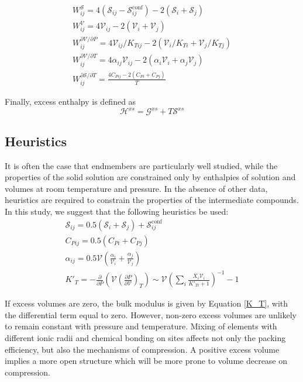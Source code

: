 \documentclass[review]{elsarticle}
\begin{document}
\begin{eqnarray}
  W^{\mathcal{S}}_{ij} = 4 (\mathcal{S}_{ij} - \mathcal{S}^{\textrm{conf}}_{ij}) - 2(\mathcal{S}_i + \mathcal{S}_j) \\
  W^{\mathcal{V}}_{ij} = 4 \mathcal{V}_{ij} - 2(\mathcal{V}_i + \mathcal{V}_j) \\
  W^{\partial\mathcal{V}/\partial P}_{ij} = 4 \mathcal{V}_{ij}/K_{T{ij}} - 2(\mathcal{V}_{i}/K_{T{i}} + \mathcal{V}_{j}/K_{T{j}}) \\
  W^{\partial\mathcal{V}/\partial T}_{ij} = 4 \alpha_{ij} \mathcal{V}_{ij} - 2(\alpha_{i} \mathcal{V}_i + \alpha_{j} \mathcal{V}_j) \\
  W^{\partial\mathcal{S}/\partial T}_{ij} = \frac{4 C_{P{ij}} - 2(C_{P{i}} + C_{P{j}})}{T} 
\end{eqnarray}

Finally, excess enthalpy is defined as
\begin{equation}
 \mathcal{H}^{xs} = \mathcal{G}^{xs} + T\mathcal{S}^{xs}
\end{equation}

\subsection{Heuristics}
It is often the case that endmembers are particularly well studied, while the properties of the solid solution are constrained only by enthalpies of solution and volumes at room temperature and pressure. In the absence of other data, heuristics are required to constrain the properties of the intermediate compounds. In this study, we suggest that the following heuristics be used:
\begin{eqnarray}
  \mathcal{S}_{ij} = 0.5(\mathcal{S}_i + \mathcal{S}_j) + \mathcal{S}^{\textrm{conf}}_{ij} \\
  C_{P{ij}} = 0.5(C_{P{i}} + C_{P{j}}) \\
  \alpha_{ij} = 0.5 \mathcal{V} \left(\frac{\alpha_i}{\mathcal{V}_i} + \frac{\alpha_j}{\mathcal{V}_j}\right)\\
  K'_{T} = -\frac{\partial}{\partial P} \left (\mathcal{V}\left( \frac{\partial P}{\partial \mathcal{V}} \right)_T \right) \sim \mathcal{V} \left(\sum_i \frac{X_i \mathcal{V}_i}{K'_{Ti} + 1} \right)^{-1} - 1
\end{eqnarray}

If excess volumes are zero, the bulk modulus is given by Equation \ref{K_T}, with the differential term equal to zero. However, non-zero excess volumes are unlikely to remain constant with pressure and temperature. Mixing of elements with different ionic radii and chemical bonding on sites affects not only the packing efficiency, but also the mechanisms of compression. A positive excess volume implies a more open structure which will be more prone to volume decrease on compression.
\end{document}
